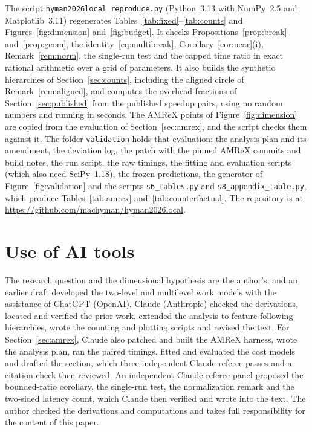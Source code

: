 \documentclass[12pt]{article}
\theoremstyle{remark}
\begin{document}
The script \texttt{hyman2026local\_reproduce.py} (Python~3.13 with NumPy~2.5 and Matplotlib~3.11) regenerates Tables~\ref{tab:fixed}--\ref{tab:counts} and Figures~\ref{fig:dimension} and~\ref{fig:budget}. It checks Propositions~\ref{prop:break} and~\ref{prop:geom}, the identity~\eqref{eq:multibreak}, Corollary~\ref{cor:near}(i), Remark~\ref{rem:norm}, the single-run test and the capped time ratio in exact rational arithmetic over a grid of parameters. It also builds the synthetic hierarchies of Section~\ref{sec:counts}, including the aligned circle of Remark~\ref{rem:aligned}, and computes the overhead fractions of Section~\ref{sec:published} from the published speedup pairs, using no random numbers and running in seconds. The AMReX points of Figure~\ref{fig:dimension} are copied from the evaluation of Section~\ref{sec:amrex}, and the script checks them against it. The folder \texttt{validation} holds that evaluation: the analysis plan and its amendment, the deviation log, the patch with the pinned AMReX commits and build notes, the run script, the raw timings, the fitting and evaluation scripts (which also need SciPy~1.18), the frozen predictions, the generator of Figure~\ref{fig:validation} and the scripts \texttt{s6\_tables.py} and \texttt{s8\_appendix\_table.py}, which produce Tables~\ref{tab:amrex} and~\ref{tab:counterfactual}. The repository is at \url{https://github.com/machyman/hyman2026local}.

\section*{Use of AI tools}

The research question and the dimensional hypothesis are the author's, and an earlier draft developed the two-level and multilevel work models with the assistance of ChatGPT (OpenAI). Claude (Anthropic) checked the derivations, located and verified the prior work, extended the analysis to feature-following hierarchies, wrote the counting and plotting scripts and revised the text. For Section~\ref{sec:amrex}, Claude also patched and built the AMReX harness, wrote the analysis plan, ran the paired timings, fitted and evaluated the cost models and drafted the section, which three independent Claude referee passes and a citation check then reviewed. An independent Claude referee panel proposed the bounded-ratio corollary, the single-run test, the normalization remark and the two-sided latency count, which Claude then verified and wrote into the text. The author checked the derivations and computations and takes full responsibility for the content of this paper.
\end{document}
